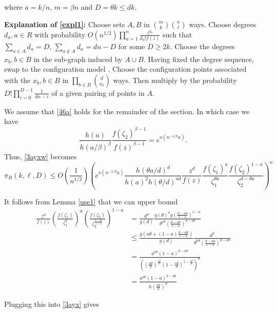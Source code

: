\documentclass[11pt]{article}
\def\b{\beta}
\def\z{\zeta}
\def\th{\theta}
\def\p{\pi}
\newcommand{\ignore}[1]{}
\newcommand{\brac}[1]{\left(#1\right)}
\newcommand{\bfrac}[2]{\brac{\frac{#1}{#2}}}
\newcommand{\beq}[1]{\begin{equation}\label{#1}}
\newcommand{\eeq}{\end{equation}}
\begin{document}
where $a=k/n$, $m=\b n$ and $D=\th k\leq dk$.

{\bf Explanation of \eqref{expl1}:}
Choose sets $A,B$ in  $\binom{m}{k}\binom{n}{\ell}$ ways. Choose degrees $d_a, a\in R$ with probability 
$O(n^{1/2})\prod_{a=1}^n\frac{z^{d_a}}{d_a!f(z)}$ such that $\sum_{a\in A}d_a=D,\,\sum_{a\notin A}d_a=dn-D$ for some $D\geq 2k$.
Choose the degrees $x_b,b\in B$ in the sub-graph induced by $A\cup B$. Having fixed the degree sequence,
swap to the configuration model \cite{BoCo}. Choose the configuration points associated with
the $x_b,b\in B$ in $\prod_{b\in B}\binom{d}{x_b}$ ways. 
Then multiply by the probability $D!\prod_{i=0}^{D-1}\frac{1}{dn-i}$ of a given pairing of points in $A$.

We assume that \eqref{46a} holds
for the remainder of the section. In which case we have
$$\frac{h(a)}{h(a/\b)^{\b}}\frac{f(\z_2)^{\b-1}}{f(z)^{\b-1}}=e^{o(n^{-1/8}a)}.$$
Thus,
\eqref{3ayxw} becomes
\beq{3ayx}
\p_R(k,\ell,D)\leq O\bfrac{1}{n^{1/2}}\brac{e^{o(n^{-1/8}a)}
\frac{h(\th a/d)^d}{h(a)^2h(\th/d)^{ad}}\frac{z^d}{f(z)}\frac{f(\z_1)^a}{\z_1^{\th a}}
\frac{f(\z_2)^{1-a}}{\z_2^{d-\th a}}}^n
\eeq

\ignore{{\bf {\Large Mathematica says that $F_\th(a)=\frac{h(\th a/3)^33^{(3-\th)a}}{h(a)^2h(\th-2)^a}$ works for $d=3$,
provided $2.08\leq\th\leq 3$.\\
Note that
$\frac{z^d}{f(z)}\frac{f(\z_1)^a}{\z_1^{\th a}}\frac{f(\z_2)^{1-a}}{\z_2^{d-\th a}}\leq 1$.\\
For a fixed $\th$ the function $F_\th(a)$ is log-concave for $0\leq a\leq a_\th=\frac{3(\th-2)}{\th}$ and log-convex for
$a\geq a_\th$. The function $F\th(a_\th)<1$ for $\th\geq 2.08$.
}}}

It follows from Lemma \ref{use1} that we can upper bound
\begin{align*}
\frac{z^d}{f(z)}\bfrac{f(\z_1)}{\z_1^\th}^a\bfrac{f(\z_2)}{\z_2^{\frac{d-a\th}{1-a}}}^{1-a}
&= \frac{d^d}{g(d)}\frac{g(\th)^a g\bfrac{d-a\th}{1-a}^{1-a}}{\th^{a\th}\bfrac{d-a\th}{1-a}^{d-a\th}}\\
&\le \frac{g(a\th+(1-a)\frac{d-a\th}{1-a})}{g(d)} \frac{d^d}{\th^{a\th}\bfrac{d-a\th}{1-a}^{d-a\th}}\\
&= \frac{a^{a\th}(1-a)^{d-a\th}}{\brac{\bfrac{a\th}{d}^{\frac{a\th}{d}}(1-\frac{a\th}{d})^{1-\frac{a\th}{d}}}^d}\\
&= \frac{a^{a\th}(1-a)^{d-a\th}}{h\bfrac{a\th}{d}^d}
\end{align*}


Plugging this into \eqref{3ayx} gives
\end{document}

